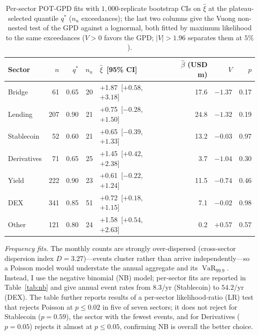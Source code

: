 \documentclass[runningheads]{llncs}
\newcommand{\VaR}{\operatorname{VaR}}
\begin{document}
\begin{table}[tb]
\centering
\caption{Per-sector POT-GPD fits with $1{,}000$-replicate bootstrap CIs
on $\hat\xi$ at the plateau-selected quantile $q^*$ ($n_u$ exceedances);
the last two columns give the Vuong non-nested test of
the GPD against a lognormal, both fitted by
maximum likelihood to the same exceedances ($V>0$ favors the GPD;
$|V|>1.96$ separates them at $5\%$).}
\label{tab:per-sector-pot}
\footnotesize
\setlength{\tabcolsep}{4pt}
\begin{tabular}{lrrrlrrr}
\toprule
Sector  & $n$ & $q^*$ & $n_u$ & $\hat\xi$ \,[95\% CI] & $\hat\beta$ (USD m) & $V$ & $p$ \\
\midrule
Bridge        &      61 & 0.65 & 20 & +1.87 \,[$+0.58$, $+3.18$] &  17.6 & $-1.37$ & 0.17 \\
Lending       &     207 & 0.90 & 21 & +0.75 \,[$-0.28$, $+1.50$] &  24.8 & $-1.32$ & 0.19 \\
Stablecoin    &      52 & 0.60 & 21 & +0.65 \,[$-0.39$, $+1.33$] &  13.2 & $-0.03$ & 0.97 \\
Derivatives   &      71 & 0.65 & 25 & +1.45 \,[$+0.42$, $+2.38$] &   3.7 & $-1.04$ & 0.30 \\
Yield         &     222 & 0.90 & 23 & +0.61 \,[$-0.22$, $+1.24$] &  11.5 & $-0.74$ & 0.46 \\
DEX           &     341 & 0.85 & 51 & +0.72 \,[$+0.18$, $+1.15$] &   7.1 & $-0.02$ & 0.98 \\
Other         &     121 & 0.80 & 24 & +1.58 \,[$+0.54$, $+2.63$] &   0.2 & $+0.57$ & 0.57 \\
\bottomrule
\end{tabular}
\end{table}

\emph{Frequency fits.} The monthly counts are strongly over-dispersed (cross-sector dispersion index $D = 3.27$)---events cluster rather than arrive independently---so a Poisson model would understate the annual aggregate and its $\VaR_{99.9}$. Instead, I use the negative binomial (NB) model; per-sector fits are reported in Table~\ref{tab:nb} and give annual event rates from $8.3$/yr (Stablecoin) to $54.2$/yr (DEX). The table further reports results of a per-sector likelihood-ratio (LR) test that rejects Poisson at $p \le 0.02$ in five of seven sectors; it does not reject
for Stablecoin ($p = 0.59$), the sector with the fewest events, and for
Derivatives ($p = 0.05$) rejects it almost at $p \le 0.05$, confirming NB is overall the better choice.
\end{document}
